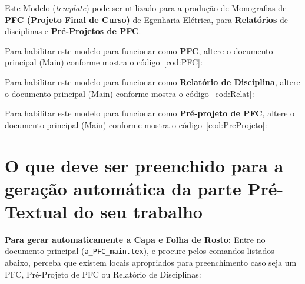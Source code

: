 Este Modelo ({\it template}) pode ser utilizado para a produção de Monografias de {\bf PFC (Projeto Final de Curso)} de Egenharia Elétrica, para {\bf Relatórios} de disciplinas e {\bf Pré-Projetos de PFC}.

\vspace{1cm}

Para habilitar este modelo para funcionar como {\bf PFC}, altere o documento principal (Main) conforme mostra o código~\ref{cod:PFC}: 


\vspace{1cm}

Para habilitar este modelo para funcionar como {\bf Relatório de Disciplina}, altere o documento principal (Main) conforme mostra o código~\ref{cod:Relat}: 


\pagebreak\clearpage\newpage

Para habilitar este modelo para funcionar como {\bf Pré-projeto de PFC}, altere o documento principal (Main) conforme mostra o código~\ref{cod:PreProjeto}: 




\section{O que deve ser preenchido para a geração automática da parte Pré-Textual do seu trabalho}

{\bf Para gerar automaticamente a Capa e Folha de Rosto:} Entre no documento principal (\verb|a_PFC_main.tex|), e procure pelos comandos listados abaixo, perceba que existem locais apropriados para preenchimento caso seja um PFC, Pré-Projeto de PFC ou Relatório de Disciplinas:

